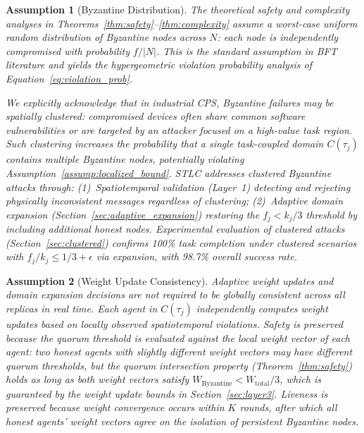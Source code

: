 \documentclass[manuscript,screen,review]{acmart}
\newtheorem{assumption}{Assumption}
\begin{document}
\begin{assumption}[Byzantine Distribution]
\label{assump:byz_distribution}
The theoretical safety and complexity analyses in Theorems~\ref{thm:safety}--\ref{thm:complexity} assume a \emph{worst-case uniform random} distribution of Byzantine nodes across $N$: each node is independently compromised with probability $f/|N|$. This is the standard assumption in BFT literature and yields the hypergeometric violation probability analysis of Equation~\eqref{eq:violation_prob}.

We explicitly acknowledge that in industrial CPS, Byzantine failures may be \emph{spatially clustered}: compromised devices often share common software vulnerabilities or are targeted by an attacker focused on a high-value task region. Such clustering \emph{increases} the probability that a single task-coupled domain $C(\tau_j)$ contains multiple Byzantine nodes, potentially violating Assumption~\ref{assump:localized_bound}. STLC addresses clustered Byzantine attacks through: (1)~\textit{Spatiotemporal validation} (Layer~1) detecting and rejecting physically inconsistent messages regardless of clustering; (2)~\textit{Adaptive domain expansion} (Section~\ref{sec:adaptive_expansion}) restoring the $f_j < k_j/3$ threshold by including additional honest nodes. Experimental evaluation of clustered attacks (Section~\ref{sec:clustered}) confirms 100\% task completion under clustered scenarios with $f_j/k_j \leq 1/3 + \epsilon$ via expansion, with 98.7\% overall success rate.
\end{assumption}

\begin{assumption}[Weight Update Consistency]
\label{assump:weight_consistency}
Adaptive weight updates and domain expansion decisions are \emph{not} required to be globally consistent across all replicas in real time. Each agent in $C(\tau_j)$ independently computes weight updates based on locally observed spatiotemporal violations. Safety is preserved because the quorum threshold is evaluated against the \emph{local} weight vector of each agent: two honest agents with slightly different weight vectors may have different quorum thresholds, but the quorum intersection property (Theorem~\ref{thm:safety}) holds as long as both weight vectors satisfy $W_{\text{Byzantine}} < W_{\text{total}}/3$, which is guaranteed by the weight update bounds in Section~\ref{sec:layer3}. Liveness is preserved because weight convergence occurs within $K$ rounds, after which all honest agents' weight vectors agree on the isolation of persistent Byzantine nodes.
\end{assumption}
\end{document}
